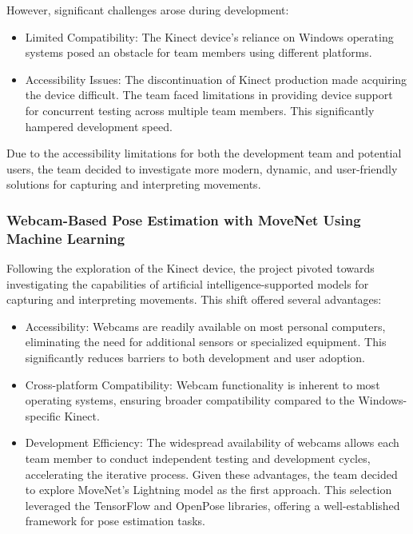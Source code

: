 \documentclass[]{article}
\begin{document}
\noindent However, significant challenges arose during development:
\begin{itemize}

\item Limited Compatibility: The Kinect device's reliance on Windows operating systems posed an obstacle for team members using different platforms.
\item Accessibility Issues: The discontinuation of Kinect production made acquiring the device difficult. The team faced limitations in providing device support for concurrent testing across multiple team members. This significantly hampered development speed.
\end{itemize}

\noindent Due to the accessibility limitations for both the development team and potential users, the team decided to investigate more modern, dynamic, and user-friendly solutions for capturing and interpreting movements.\\

\subsubsection{Webcam-Based Pose Estimation with MoveNet Using Machine Learning}

Following the exploration of the Kinect device, the project pivoted towards investigating the capabilities of artificial intelligence-supported models for capturing and interpreting movements. This shift offered several advantages:

\begin{itemize}
\item Accessibility: Webcams are readily available on most personal computers, eliminating the need for additional sensors or specialized equipment. This significantly reduces barriers to both development and user adoption.
\item Cross-platform Compatibility: Webcam functionality is inherent to most operating systems, ensuring broader compatibility compared to the Windows-specific Kinect.
\item Development Efficiency: The widespread availability of webcams allows each team member to conduct independent testing and development cycles, accelerating the iterative process.
Given these advantages, the team decided to explore MoveNet's Lightning model as the first approach. This selection leveraged the TensorFlow and OpenPose libraries, offering a well-established framework for pose estimation tasks.
\end{itemize}
\end{document}
